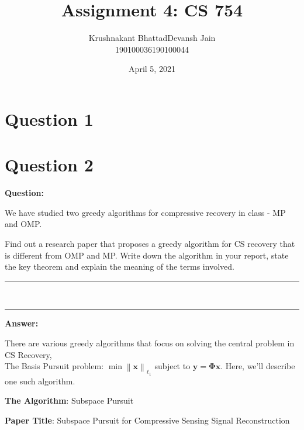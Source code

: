 \documentclass[fleqn, 11pt]{article}
\title{Assignment 4: CS 754}
\author{ 
\begin{tabular}{|c|c|}
     \hline
     \textsf{Krushnakant Bhattad} & \textsf{Devansh Jain} \\
     \hline
     \textsf{190100036} & \textsf{190100044}\\
     \hline
\end{tabular}
}
\date{April 5, 2021}
\newcommand{\bs}[1]{\boldsymbol{#1}}
\newcommand\norm[1]{\left\lVert#1\right\rVert}
\newcommand{\HRule}{\rule{\linewidth}{0.5mm}}
\begin{document}
\maketitle
\tableofcontents
\thispagestyle{empty}
\setcounter{page}{0}

\newpage
\section*{Question 1}
\setcounter{equation}{0}


\newpage
\section*{Question 2}
\setcounter{equation}{0}


\textbf{Question: }

\smallskip
We have studied two greedy algorithms for compressive recovery in class - MP and OMP.

\smallskip

Find out a research paper that proposes a greedy algorithm for CS recovery that is
different from OMP and MP. Write down the algorithm in your report, state the key theorem and explain the
meaning of the terms involved.

\vspace{10pt}

\begin{spacing}{0.05}
\noindent
\HRule\\
\HRule
\end{spacing}

\vspace{10pt}

\medskip

\textbf{\large Answer: }

\medskip

There are various greedy algorithms that focus on solving the central problem in CS Recovery, \\
The Basis Pursuit problem: $\min \norm{\bs{x}}_{\ell_1} $ subject to $\bs{y = \Phi x}$. 
Here, we'll describe one such algorithm.

\medskip

\textbf{The Algorithm}: Subspace Pursuit 

\medskip

\textbf{Paper Title}: Subspace Pursuit for Compressive Sensing Signal
Reconstruction

\medskip
\end{document}
